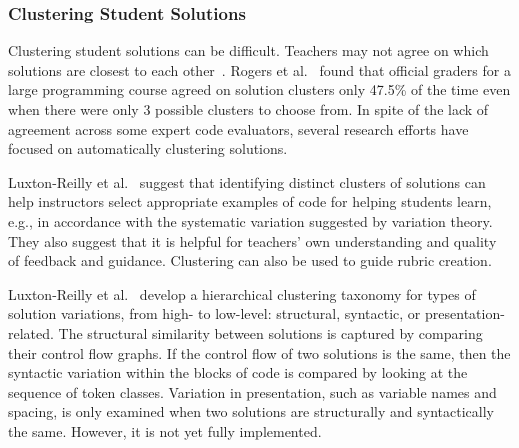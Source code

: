 

\subsubsection{Clustering Student Solutions}

Clustering student solutions can be difficult. Teachers may not agree on which solutions are closest to each other~\cite{Gaudencio}. Rogers et al.~\cite{ACESthesis} found that official graders for a large programming course agreed on solution clusters only 47.5\% of the time even when there were only 3 possible clusters to choose from. In spite of the lack of agreement across some expert code evaluators, several research efforts have focused on automatically clustering solutions.


Luxton-Reilly et al.~\cite{Luxton13} suggest that identifying distinct clusters of solutions can help instructors select appropriate examples of code for helping students learn, e.g., in accordance with the systematic variation suggested by variation theory. They also suggest that it is helpful for teachers' own understanding and quality of feedback and guidance. Clustering can also be used to guide rubric creation.

Luxton-Reilly et al.~\cite{Luxton13} develop a hierarchical clustering taxonomy for types of solution variations, from high- to low-level: structural, syntactic, or presentation-related. The structural similarity between solutions is captured by comparing their control flow graphs. If the control flow of two solutions is the same, then the syntactic variation within the blocks of code is compared by looking at the sequence of token classes. Variation in presentation, such as variable names and spacing, is only examined when two solutions are structurally and syntactically the same. However, it is not yet fully implemented. %


